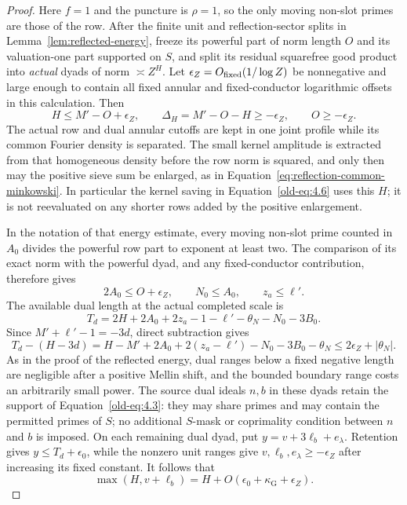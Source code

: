 \documentclass[11pt,a4paper]{article}
\numberwithin{equation}{section}
\numberwithin{figure}{section}
\theoremstyle{definition}
\theoremstyle{remark}
\begin{document}
\begin{proof}
Here $f=1$ and the puncture is $\rho=1$, so the only moving non-slot
primes are those of the row.  After the finite unit and reflection-sector
splits in Lemma~\ref{lem:reflected-energy}, freeze its powerful part of norm length
$O$ and its valuation-one part supported on $S$, and split its residual
squarefree good product into \emph{actual} dyads of norm $\asymp Z^H$.  Let
$\epsilon_Z=O_{\rm fixed}(1/\log Z)$ be nonnegative and large enough
to contain all fixed annular and fixed-conductor logarithmic offsets
in this calculation.  Then
\[
 H\le M'-O+\epsilon_Z,\qquad
 \Delta_H=M'-O-H\ge-\epsilon_Z,\qquad O\ge-\epsilon_Z.
\]
The actual row and dual annular cutoffs are kept in one joint
profile while its common Fourier density is separated.  The small
kernel amplitude is extracted from that homogeneous density before
the row norm is squared, and only then may the positive sieve sum be
enlarged, as in Equation~\eqref{eq:reflection-common-minkowski}.
In particular the kernel saving in
Equation~\eqref{old-eq:4.6} uses this $H$; it is not reevaluated on
any shorter rows added by the positive enlargement.

In the notation of that energy estimate, every moving non-slot prime
counted in $A_0$ divides the powerful row part to exponent at least
two.  The comparison of its exact norm with the powerful dyad, and
any fixed-conductor contribution, therefore gives
\[
 2A_0\le O+\epsilon_Z,\qquad N_0\le A_0,\qquad z_a\le\ell'.
\]
The available dual length at the actual completed scale is
\[
 T_d=2H+2A_0+2z_a-1-\ell'-\theta_N-N_0-3B_0.
\]
Since $M'+\ell'-1=-3d$, direct subtraction gives
\[
 T_d-(H-3d)
 =H-M'+2A_0+2(z_a-\ell')-N_0-3B_0-\theta_N
 \le 2\epsilon_Z+|\theta_N|.
\]
As in the proof of the reflected energy, dual ranges below a fixed
negative length are negligible after a positive Mellin shift, and
the bounded boundary range costs an arbitrarily small power.
The source dual ideals $n,b$ in these dyads retain the support of
Equation~\eqref{old-eq:4.3}: they may share primes and may contain
the permitted primes of $S$; no additional $S$-mask or coprimality
condition between $n$ and $b$ is imposed.
On each remaining dual dyad, put $y=v+3\ell_b+e_\lambda$.  Retention
gives $y\le T_d+\epsilon_0$, while the nonzero unit ranges give
$v,\ell_b,e_\lambda\ge-\epsilon_Z$ after increasing its fixed
constant.  It follows that
\[
 \max(H,v+\ell_b)=H+O(\epsilon_0+\kappa_{\mathrm G}+\epsilon_Z).
\]


\end{proof}
\end{document}
